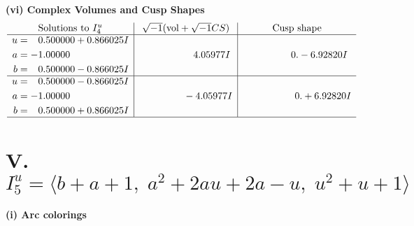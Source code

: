 \documentclass[1p]{elsarticle_modified}
\theoremstyle{definition}
\newcommand{\I}{\sqrt{-1}}
\begin{document}
\newpage\flushleft \textbf{(vi) Complex Volumes and Cusp Shapes}
$$\begin{array}{c|c|c}  
\text{Solutions to }I^u_{4}& \I (\text{vol} + \sqrt{-1}CS) & \text{Cusp shape}\\
 \hline 
\begin{aligned}
u &= \phantom{-}0.500000 + 0.866025 I \\
a &= -1.00000\phantom{ +0.000000I} \\
b &= \phantom{-}0.500000 - 0.866025 I\end{aligned}
 & \phantom{-0.000000 -}4.05977 I & \phantom{-0.000000 } 0. - 6.92820 I \\ \hline\begin{aligned}
u &= \phantom{-}0.500000 - 0.866025 I \\
a &= -1.00000\phantom{ +0.000000I} \\
b &= \phantom{-}0.500000 + 0.866025 I\end{aligned}
 & \phantom{-0.000000 } -4.05977 I & \phantom{-0.000000 -}0. + 6.92820 I\\
 \hline 
 \end{array}$$\newpage\newpage\renewcommand{\arraystretch}{1}
\centering \section*{V. $I^u_{5}= \langle b+a+1,\;a^2+2 a u+2 a- u,\;u^2+u+1 \rangle$}
\flushleft \textbf{(i) Arc colorings}\\
\end{document}
